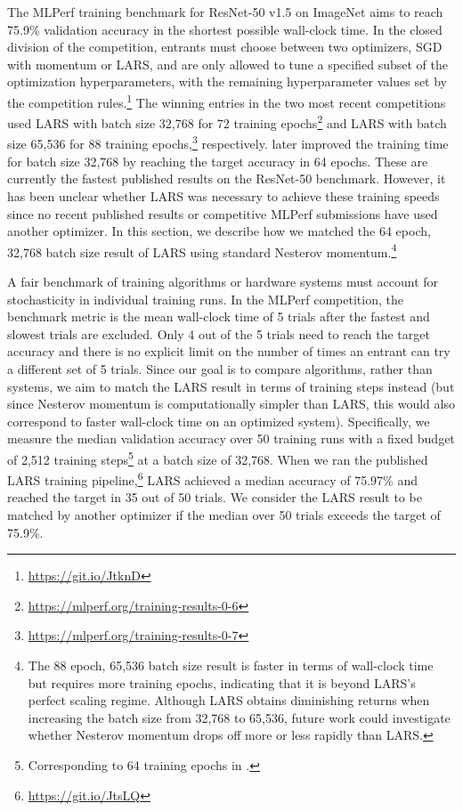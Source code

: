 \documentclass{article}
\begin{document}
The MLPerf training benchmark for ResNet-50 v1.5 on ImageNet \citep{mattson2019mlperf} aims to reach 75.9\% validation accuracy in the shortest possible wall-clock time. In the closed division of the competition, entrants must choose between two optimizers, SGD with momentum or LARS, and are only allowed to tune a specified subset of the optimization hyperparameters, with the remaining hyperparameter values set by the competition rules.\footnote{\url{https://git.io/JtknD}}
The winning entries in the two most recent competitions used LARS with batch size 32,768 for 72 training epochs\footnote{\url{https://mlperf.org/training-results-0-6}} and LARS with batch size 65,536 for 88 training epochs,\footnote{\url{https://mlperf.org/training-results-0-7}} respectively.
\citet{kumar2019scale} later improved the training time for batch size 32,768 by reaching the target accuracy in 64 epochs.
These are currently the fastest published results on the ResNet-50 benchmark.
However, it has been unclear whether LARS was necessary to achieve these training speeds since no recent published results or competitive MLPerf submissions have used another optimizer.
In this section, we describe how we matched the 64 epoch, 32,768 batch size result of LARS using standard Nesterov momentum.\footnote{The 88 epoch, 65,536 batch size result is faster in terms of wall-clock time but requires more training epochs, indicating that it is beyond LARS's perfect scaling regime. Although LARS obtains diminishing returns when increasing the batch size from 32,768 to 65,536, future work could investigate whether Nesterov momentum drops off more or less rapidly than LARS.}

A fair benchmark of training algorithms or hardware systems must account for stochasticity in individual training runs. In the MLPerf competition, the benchmark metric is the mean wall-clock time of 5 trials after the fastest and slowest trials are excluded. Only 4 out of the 5 trials need to reach the target accuracy and there is no explicit limit on the number of times an entrant can try a different set of 5 trials.
Since our goal is to compare algorithms, rather than systems, we aim to match the LARS result in terms of training steps instead (but since Nesterov momentum is computationally simpler than LARS, this would also correspond to faster wall-clock time on an optimized system).
Specifically, we measure the median validation accuracy over 50 training runs with a fixed budget of 2,512 training steps\footnote{Corresponding to 64 training epochs in \citet{kumar2019scale}.} at a batch size of 32,768.
When we ran the published LARS training pipeline,\footnote{\url{https://git.io/JtsLQ}} LARS achieved a median accuracy of 75.97\% and reached the target in 35 out of 50 trials. We consider the LARS result to be matched by another optimizer if the median over 50 trials exceeds the target of 75.9\%.
\end{document}
